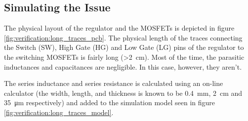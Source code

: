 \subsection{Simulating the Issue}

The physical layout of  the  regulator  and  the  MOSFETs  is depicted in figure
\ref{fig:verification:long_traces_pcb}.  The  physical   length  of  the  traces
connecting the  Switch  (SW),  High  Gate  (HG)  and  Low  Gate (LG) pins of the
regulator to the switching MOSFETs is fairly  long (>\SI{2}{\centi\metre}). Most
of the time, the parasitic  inductances and capacitances are negligible. In this
case, however, they aren't.

The series  inductance  and  series  resistance  is  calculated using an on-line
calculator\cite{ref:trace_inductance}\cite{ref:trace_resistance}   (the   width,
length,    and    thickness    is    known   to    be    \SI{0.4}{\milli\metre},
\SI{2}{\centi\metre}  and \SI{35}{\micro\metre} respectively) and added  to  the
simulation   model  seen  in  figure   \ref{fig:verification:long_traces_model}.



